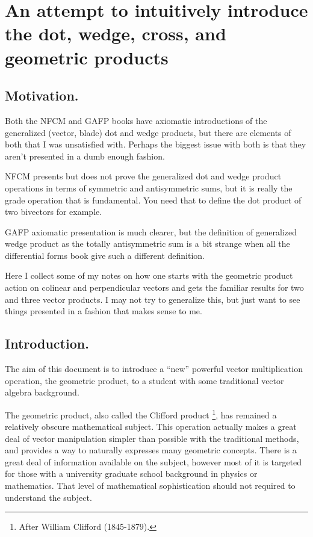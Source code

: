 \chapter{An attempt to intuitively introduce the dot, wedge, cross, and geometric products}

\date{ March 17, 2008.  Last Revision: $Date: 2009/06/04 13:13:27 $ }

\section{Motivation. }

Both the NFCM and GAFP books have axiomatic introductions of the 
generalized (vector, blade) dot and wedge products, but there are
elements of both that I was unsatisfied with.  Perhaps the biggest
issue with both is that they aren't presented in a dumb enough fashion.

NFCM presents but
does not prove the generalized dot and wedge product operations
in terms of symmetric and antisymmetric sums, but it is really the
grade operation that is fundamental.  You need that to define the
dot product of two bivectors for example.

GAFP axiomatic presentation is much clearer, but the definition of
generalized wedge product as the totally antisymmetric sum is a bit
strange when all the differential forms book give such a different
definition.

Here I collect some of my notes on how one starts with the geometric
product action on colinear and perpendicular vectors and gets the 
familiar results for two and three vector products.  I may not try to
generalize this, but just want to see things presented in a fashion
that makes sense to me.

\section{Introduction.}

The aim of this document is to introduce a ``new'' powerful vector multiplication operation, the geometric product,
to a student with some traditional vector algebra background.

The geometric product, also called the Clifford product 
\footnote{After William Clifford (1845-1879).}, has remained a relatively obscure mathematical subject. 
This operation actually makes a great deal of vector manipulation simpler than possible with the traditional methods, and
provides a way to naturally expresses many geometric concepts.
There is a great deal of information available on the subject, however most of it is targeted for those with a 
university graduate school background in physics or mathematics.  That level of mathematical sophistication
should not required to understand the subject.

